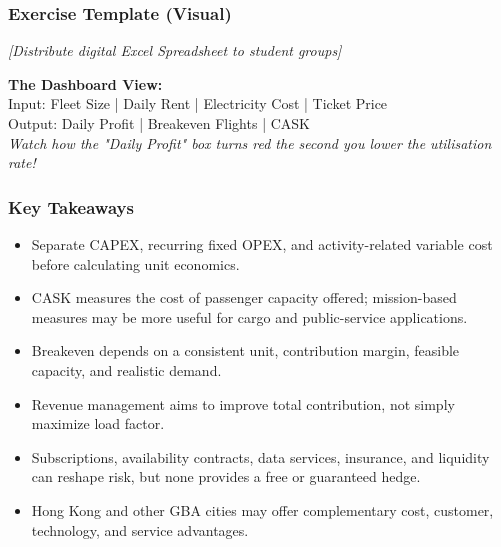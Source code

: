 \documentclass{beamer}
\begin{document}
\begin{frame}[t]
  \frametitle{Exercise Template (Visual)}
  
  \begin{center}
      \textit{[Distribute digital Excel Spreadsheet to student groups]}
      
      \vspace{0.5cm}
      
      \textbf{The Dashboard View:} \\
      \vspace{0.2cm}
      Input: Fleet Size | Daily Rent | Electricity Cost | Ticket Price \\
      Output: Daily Profit | Breakeven Flights | CASK \\
      \vspace{0.5cm}
      \textit{Watch how the "Daily Profit" box turns red the second you lower the utilisation rate!}
  \end{center}
\end{frame}

\begin{frame}[t]
  \frametitle{Key Takeaways}
  \begin{itemize}
    \item Separate CAPEX, recurring fixed OPEX, and activity-related variable cost before calculating unit economics.
    \item CASK measures the cost of passenger capacity offered; mission-based measures may be more useful for cargo and public-service applications.
    \item Breakeven depends on a consistent unit, contribution margin, feasible capacity, and realistic demand.
    \item Revenue management aims to improve total contribution, not simply maximize load factor.
    \item Subscriptions, availability contracts, data services, insurance, and liquidity can reshape risk, but none provides a free or guaranteed hedge.
    \item Hong Kong and other GBA cities may offer complementary cost, customer, technology, and service advantages.
  \end{itemize}
\end{frame}
\end{document}
